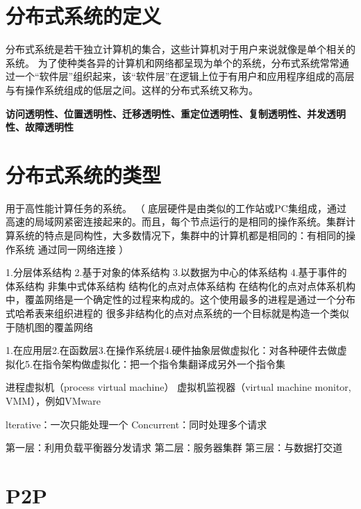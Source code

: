 \documentclass[twoside]{ctexart}
\begin{document}
\pagestyle{empty}

\begin{multicols}{2}
  \section{分布式系统的定义} 分布式系统是若干独立计算机的集合，这些计算机对于用户来说就像是单个相关的系统。 为了使种类各异的计算机和网络都呈现为单个的系统，分布式系统常常通过一个``软件层''组织起来，该``软件层''在逻辑上位于有用户和应用程序组成的高层与有操作系统组成的低层之间。这样的分布式系统又称为。  
  
   \textbf{访问透明性、位置透明性、迁移透明性、重定位透明性、复制透明性、并发透明性、故障透明性}
  
  \section{分布式系统的类型}  用于高性能计算任务的系统。 （ 底层硬件是由类似的工作站或PC集组成，通过高速的局域网紧密连接起来的。而且，每个节点运行的是相同的操作系统。集群计算系统的特点是同构性，大多数情况下，集群中的计算机都是相同的：有相同的操作系统 通过同一网络连接 ）  

   1.分层体系结构 2.基于对象的体系结构 3.以数据为中心的体系结构 4.基于事件的体系结构 非集中式体系结构 结构化的点对点体系结构  在结构化的点对点体系机构中，覆盖网络是一个确定性的过程来构成的。这个使用最多的进程是通过一个分布式哈希表来组织进程的   很多非结构化的点对点系统的一个目标就是构造一个类似于随机图的覆盖网络     
  
   1.在应用层2.在函数层3.在操作系统层4.硬件抽象层做虚拟化：对各种硬件去做虚拟化5.在指令架构做虚拟化：把一个指令集翻译成另外一个指令集
  
   进程虚拟机（process virtual machine） 虚拟机监视器（virtual machine monitor, VMM），例如VMware 
  
   lterative：一次只能处理一个 Concurrent：同时处理多个请求 
  
   第一层：利用负载平衡器分发请求 第二层：服务器集群 第三层：与数据打交道

  \section{P2P} 


\end{multicols}
\end{document}
